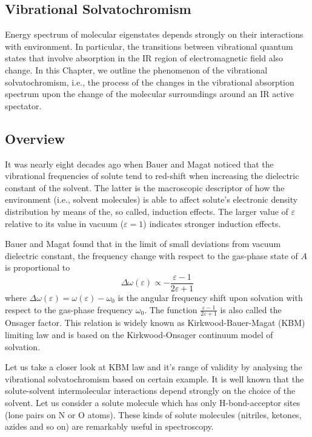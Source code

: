 \documentclass[a4paper,titlepage,twoside,fleqn,12pt]{book}
\begin{document}
\begin{refsection}
\chapter{Vibrational Solvatochromism\label{c:vibr-solv}}

Energy spectrum of molecular eigenstates
depends strongly on their interactions with environment. In particular,
the transitions between vibrational quantum states
that involve absorption in the IR region of 
electromagnetic field also change. 
In this Chapter, we outline the phenomenon 
of the vibrational solvatochromism, i.e., the process of
the changes in the vibrational absorption spectrum upon the change 
of the molecular surroundings around an IR active spectator.

\section{Overview}
%
It was nearly eight decades ago when Bauer and Magat noticed 
that the vibrational frequencies
of solute tend to red-shift when
increasing the dielectric constant of the solvent. \citep{Bauer.Magat.JPhysRadium.1938} 
The latter is the macroscopic descriptor 
of how the environment (i.e., solvent molecules) is able to affect solute's 
electronic density distribution by means of the, so called, induction
effects. The larger value of $\varepsilon$ relative to its value in vacuum
($\varepsilon=1$) indicates stronger induction effects. 

Bauer and Magat found that in the limit of small deviations
from vacuum dielectric constant, the frequency change with respect to the
gas-phase state of $A$ is proportional to
%
\begin{equation} \label{e:kbm}
\Delta \omega(\varepsilon) \propto - \frac{\varepsilon-1}{2\varepsilon+1}
\end{equation}
%
where $\Delta\omega(\varepsilon) = \omega(\varepsilon) - \omega_0$ is the
angular frequency shift upon solvation with respect to the gas-phase frequency
$\omega_0$. The function $\frac{\varepsilon-1}{2\varepsilon+1}$ is also called
the Onsager factor. This relation is widely known as Kirkwood-Bauer-Magat (KBM) 
limiting law and is based on the Kirkwood-Onsager continuum model of 
solvation. \citep{Kirkwood.JCP.1934,Onsager.JACS.1936}

Let us take a closer look at KBM law and it's range of validity by analysing the vibrational
solvatochromism based on certain example. It is well known that 
the solute\hyp{}solvent intermolecular interactions 
depend strongly on the choice of the solvent. \citep{Stone.TheTheoryOfIntermolecularForces.1996,Gutmann.Resch.Linert.CoordChemRev.1982} 
Let us consider a solute molecule which has
only H\hyp{}bond\hyp{}acceptor sites (lone pairs on N or O atoms). These kinds of solute molecules
(nitriles, ketones, azides and so on) are remarkably useful in spectroscopy.


\end{refsection}
\end{document}
